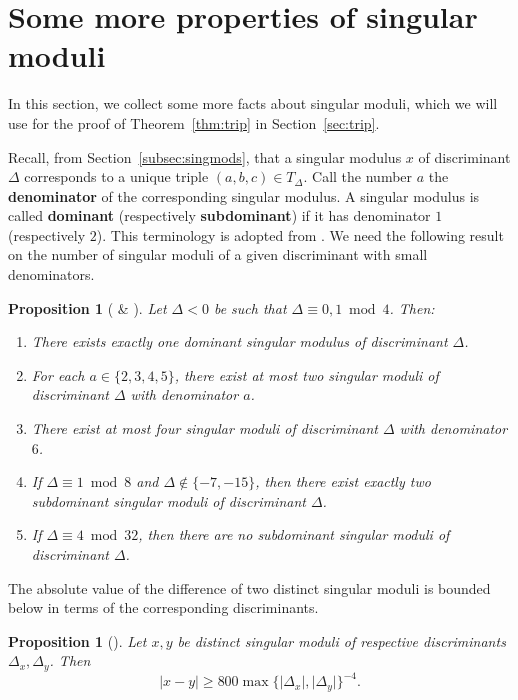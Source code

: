 \documentclass[11pt,a4paper, british]{amsart}
\newtheorem{prop}[thm]{Proposition}
\theoremstyle{definition}
\theoremstyle{remark}
\numberwithin{equation}{section}
\begin{document}
\section{Some more properties of singular moduli}\label{sec:singmod}

In this section, we collect some more facts about singular moduli, which we will use for the proof of Theorem~\ref{thm:trip} in Section~\ref{sec:trip}.

Recall, from Section~\ref{subsec:singmods}, that a singular modulus $x$ of discriminant $\Delta$ corresponds to a unique triple $(a, b, c) \in T_\Delta$. Call the number $a$ the \textbf{denominator} of the corresponding singular modulus. A singular modulus is called \textbf{dominant} (respectively \textbf{subdominant}) if it has denominator $1$ (respectively $2$). This terminology is adopted from \cite{BiluGunTron22, FayeRiffaut18, Riffaut19}. We need the following result on the number of singular moduli of a given discriminant with small denominators.

\begin{prop}[{\cite[Proposition~2.6]{BiluLucaMadariaga16} \& \cite[Lemma~2.1]{Fowler23}}]\label{prop:denom}
	Let $\Delta < 0$ be such that $\Delta \equiv 0, 1 \bmod 4$. Then:
	\begin{enumerate}
		\item There exists exactly one dominant singular modulus of discriminant $\Delta$.
		\item For each $a \in \{2, 3, 4, 5\}$, there exist at most two singular moduli of discriminant $\Delta$ with denominator $a$.
		\item There exist at most four singular moduli of discriminant $\Delta$ with denominator $6$.
		\item If $\Delta \equiv 1 \bmod 8$ and $\Delta \notin \{-7, -15\}$, then there exist exactly two subdominant singular moduli of discriminant $\Delta$.
		\item If $\Delta \equiv 4 \bmod 32$, then there are no subdominant singular moduli of discriminant $\Delta$.
	\end{enumerate}
\end{prop}

The absolute value of the difference of two distinct singular moduli is bounded below in terms of the corresponding discriminants.

\begin{prop}[{\cite[Theorem~1.1]{BiluFayeZhu19}}]\label{prop:sep}
	Let $x, y$ be distinct singular moduli of respective discriminants $\Delta_x, \Delta_y$. Then
	\[ \lvert x - y \rvert \geq 800 \max \{\lvert \Delta_x \rvert, \lvert \Delta_y \rvert\}^{-4}.\]
\end{prop}
\end{document}
